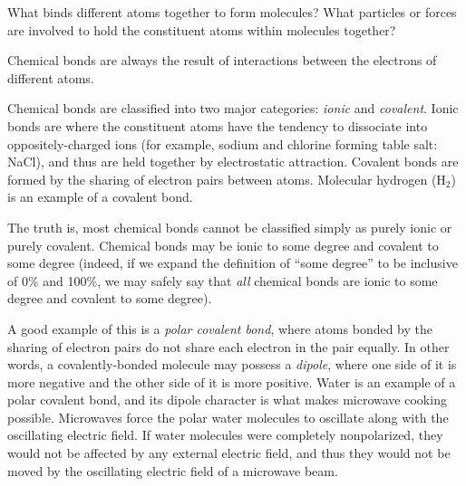 

What binds different atoms together to form molecules?  What particles or forces are involved to hold the constituent atoms within molecules together?







Chemical bonds are always the result of interactions between the electrons of different atoms.

\vskip 10pt

Chemical bonds are classified into two major categories: {\it ionic} and {\it covalent}.  Ionic bonds are where the constituent atoms have the tendency to dissociate into oppositely-charged ions (for example, sodium and chlorine forming table salt: NaCl), and thus are held together by electrostatic attraction.  Covalent bonds are formed by the sharing of electron pairs between atoms.  Molecular hydrogen (H$_{2}$) is an example of a covalent bond.

The truth is, most chemical bonds cannot be classified simply as purely ionic or purely covalent.  Chemical bonds may be ionic to some degree and covalent to some degree (indeed, if we expand the definition of ``some degree'' to be inclusive of 0\% and 100\%, we may safely say that {\it all} chemical bonds are ionic to some degree and covalent to some degree). 

A good example of this is a {\it polar covalent bond}, where atoms bonded by the sharing of electron pairs do not share each electron in the pair equally.  In other words, a covalently-bonded molecule may possess a {\it dipole}, where one side of it is more negative and the other side of it is more positive.  Water is an example of a polar covalent bond, and its dipole character is what makes microwave cooking possible.  Microwaves force the polar water molecules to oscillate along with the oscillating electric field.  If water molecules were completely nonpolarized, they would not be affected by any external electric field, and thus they would not be moved by the oscillating electric field of a microwave beam.











